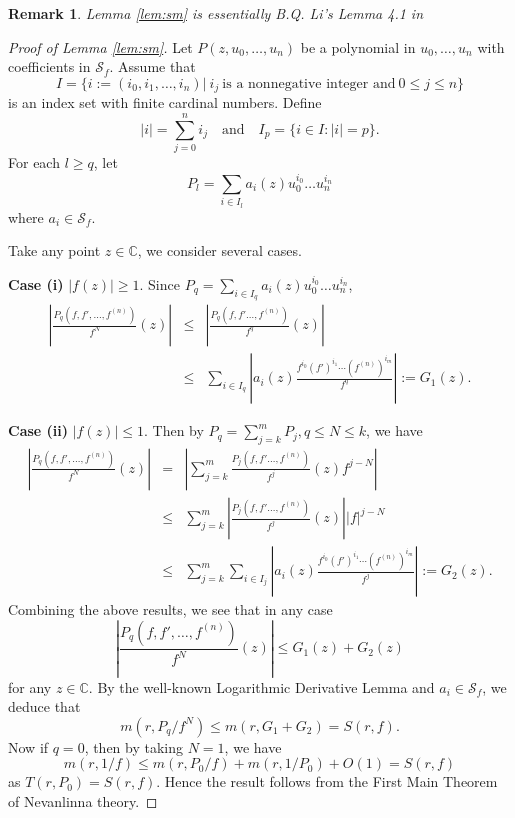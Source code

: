 \documentclass[reqno,12pt]{amsart}
\newtheorem{rmk}{Remark}
\begin{document}
\begin{rmk} Lemma \ref{lem:sm} is essentially B.Q. Li's Lemma 4.1 in \cite{Li96}
\end{rmk}

\begin{proof}[Proof of Lemma \ref{lem:sm}] 
Let $P(z, u_0, \dots, u_n)$ be a polynomial in $u_0, \dots, u_n$ with coefficients in $\mathcal{S}_f$. 
Assume that $$I=\{i:=(i_0,i_1,  \dots, i_n)|\ i_j\ \mbox{is  a nonnegative integer and}\ 0\leq j\leq n\}$$ is an index set with finite cardinal numbers. 
Define $$|i|=\sum_{j=0}^ni_j\quad \mbox{and}\quad I_p=\{i\in I: |i|=p\}.$$ 
For each $l\geq q$, let $$P_l=\sum_{i\in I_l}a_i(z)u_0^{i_0}\dots u_n^{i_n}$$
where $a_i\in\mathcal{S}_f$.

Take any point $z\in\mathbb{C}$, we consider several cases. 

\noindent \textbf{Case (i)} $|f(z)|\geq 1$. Since $P_q=\displaystyle\sum_{i\in I_q}a_i(z)u_0^{i_0}\dots u_n^{i_n}$, 
\begin{eqnarray*} \left|\frac{P_q(f, f',  \dots, f^{(n)})}{f^N}(z)\right|
&\leq&\left|\frac{P_q(f,f' \dots, f^{(n)})}{f^q}(z)\right|\\
&\leq& \sum_{i\in I_q}\left|a_i(z)\frac{f^{i_0}(f')^{i_1}\cdots (f^{(n)})^{i_m}}{f^q}\right|:=G_1(z).
\end{eqnarray*}

\noindent \textbf{Case (ii)} $|f(z)|\leq 1$. Then by $P_q=\displaystyle\sum_{j=k}^mP_j, q\leq N\leq k$, we have 
\begin{eqnarray*} \left|\frac{P_q(f, f',  \dots, f^{(n)})}{f^N}(z)\right|
&=&\left|\sum_{j=k}^m\frac{P_j(f,f' \dots, f^{(n)})}{f^j}(z)f^{j-N}\right|\\
&\leq&\sum_{j=k}^m \left|\frac{P_j(f,f' \dots, f^{(n)})}{f^j}(z)\right| |f|^{j-N}\\
&\leq& \sum_{j=k}^m\sum_{i\in I_j}\left|a_i(z)\frac{f^{i_0}(f')^{i_1}\cdots (f^{(n)})^{i_m}}{f^j}\right|:=G_2(z).
\end{eqnarray*}
Combining the above results, we see that in any case $$\left|\frac{P_q(f, f',  \dots, f^{(n)})}{f^N}(z)\right|\leq G_1(z)+G_2(z)$$ for any $z\in\mathbb{C}$. By the well-known Logarithmic Derivative Lemma and $a_i\in\mathcal{S}_f$, we deduce that $$m(r, P_q/f^N)\leq m(r, G_1+G_2)=S(r, f).$$
Now if $q=0$, then by taking $N=1$, we have $$m(r, 1/f)\leq m(r, P_0/f)+m(r, 1/P_0)+O(1)=S(r, f)$$ as $T(r, P_0)=S(r, f)$. Hence the result follows from the First Main Theorem of Nevanlinna theory. 
\end{proof}
\end{document}
